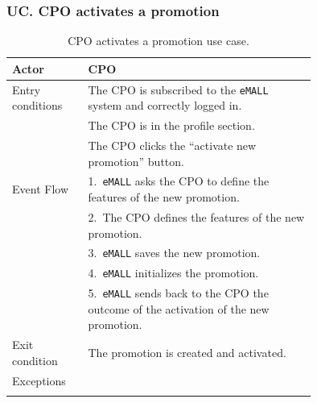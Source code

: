 \subsubsection*{UC\cuc . CPO activates a promotion}
\begin{center}
    \begin{longtable}{lp{0.75\linewidth}}
        \hline
        Actor            & CPO                                                                                 \\
        \hline
        Entry conditions & The CPO is subscribed to the \verb|eMALL| system and correctly logged in.                  \\
        & The CPO is in the profile section.                                                  \\
        & The CPO clicks the “activate new promotion” button.                                 \\
        \hline
        Event Flow       & 1.\ \verb|eMALL| asks the CPO to define the features of the new promotion.                 \\
        & 2.\ The CPO defines the features of the new promotion.                              \\
        & 3.\ \verb|eMALL| saves the new promotion.                                                  \\
        & 4.\ \verb|eMALL| initializes the promotion.                                                \\
        & 5.\ \verb|eMALL| sends back to the CPO the outcome of the activation of the new promotion. \\
        \hline
        Exit condition   & The promotion is created and activated.                                             \\
        \hline
        Exceptions       &                                                                                     \\
        \hline
        \caption{CPO activates a promotion use case.}
        \label{tab: CPO_activates_promotion_use_case}
    \end{longtable}


\end{center}

